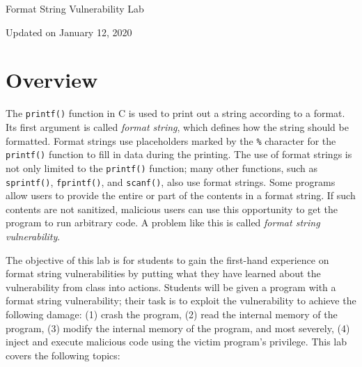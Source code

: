 




\newcommand{\formatFigs}{./Figs}






\begin{center}
{\LARGE Format String Vulnerability Lab}

\vspace{0.05in}
Updated on January 12, 2020
\end{center}




\section{Overview}


The \texttt{printf()} function in C is used to print out a string according to a format.  Its
first argument is called \textit{format string}, which defines how the string should be
formatted. Format strings use placeholders marked by the \texttt{\%} character for the
\texttt{printf()} function to fill in data during the printing.  The use of format strings is
not only limited to the \texttt{printf()} function; many other functions, such as
\texttt{sprintf()}, \texttt{fprintf()}, and \texttt{scanf()}, also use format strings. Some
programs allow users to provide the entire or part of the contents in a format string. If such
contents are not sanitized, malicious users can use this opportunity to get the program to run
arbitrary code. A problem like this is called \textit{format string vulnerability}.


The objective of this lab is for students to gain the first-hand
experience on format string vulnerabilities by putting what they have learned 
about the vulnerability from class into actions. 
Students will be given a program with a format string
vulnerability; their task is to exploit
the vulnerability to achieve the following damage: (1) crash the 
program, (2) read the internal memory of the program, (3) modify
the internal memory of the program, and most severely, 
(4) inject and execute malicious code using the victim program's privilege. 
This lab covers the following topics:


